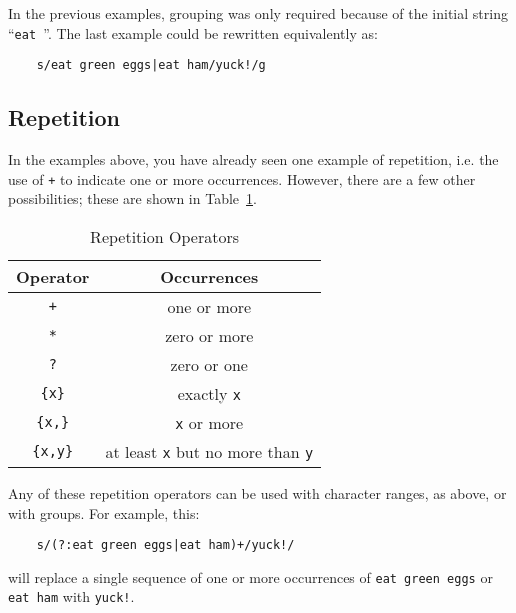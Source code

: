 In the previous examples, grouping was only required because
of the initial string ``\verb+eat +''. The last example could be rewritten
equivalently as:
\begin{verbatim}
    s/eat green eggs|eat ham/yuck!/g
\end{verbatim}


\subsection{Repetition}
In the examples above, you have already seen one example of repetition, i.e.
the use of \verb-+- to indicate one or more occurrences. However, there are
a few other possibilities; these are shown in Table~\ref{regex-greedy}.
\begin{table}[tbh]
\begin{center}
\begin{tabular}{|c|c|}
\hline
Operator & Occurrences \\
\hline
\hline
\verb-+-      & one or more \\ \hline
\verb-*-      & zero or more \\ \hline
\verb-?-      & zero or one \\ \hline
\verb-{x}-    & exactly {\tt x} \\ \hline
\verb-{x,}-   & {\tt x} or more\\ \hline
\verb-{x,y}-  & at least {\tt x} but no more than {\tt y}\\ \hline
\end{tabular}
\end{center}

\caption{ Repetition Operators }
\label{regex-greedy}
\end{table}
Any of these repetition operators can be used with character ranges, as above, or
with groups. For example, this:
\begin{verbatim}
    s/(?:eat green eggs|eat ham)+/yuck!/
\end{verbatim}
will replace a single sequence of one or more occurrences of {\tt eat green eggs}
or {\tt eat ham} with {\tt yuck!}.

